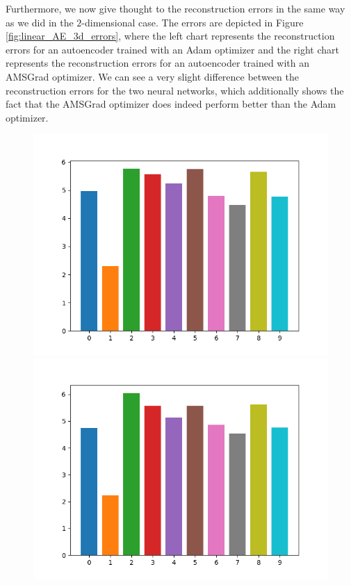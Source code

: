 Furthermore, we now give thought to the reconstruction errors in the same way as we did in the $2$-dimensional case. The errors are depicted in Figure \ref{fig:linear_AE_3d_errors}, where the left chart represents the reconstruction errors for an autoencoder trained with an Adam optimizer and the right chart represents the reconstruction errors for an autoencoder trained with an AMSGrad optimizer. We can see a very slight difference between the reconstruction errors for the two neural networks, which additionally shows the fact that the AMSGrad optimizer does indeed perform better than the Adam optimizer.

\begin{figure}
\begin{center}
   \begin{minipage}[b]{0.49\linewidth}
      \includegraphics[trim = 15mm 5mm 15mm 10mm, clip, width=\linewidth]{linear_AE_3d_adam_errors}
	\end{minipage}
   \begin{minipage}[b]{0.49\linewidth}
      \includegraphics[trim = 15mm 5mm 15mm 10mm, clip, width=\linewidth]{linear_AE_3d_amsgrad_errors}

\end{minipage}
\end{center}
\end{figure}
